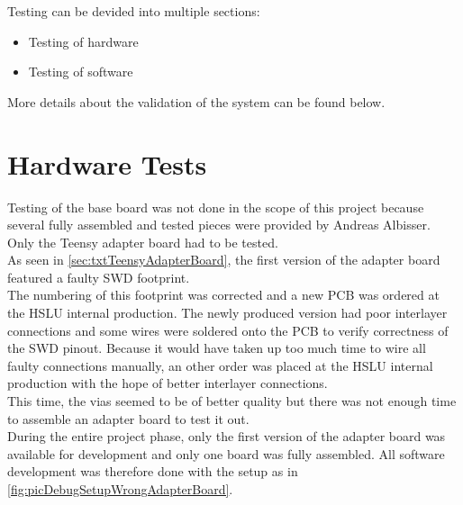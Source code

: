 %
Testing can be devided into multiple sections:
\begin{itemize}
    \item Testing of hardware
    \item Testing of software 
\end{itemize}
More details about the validation of the system can be found below.\\
%
%
%
%
\section{Hardware Tests} \label{sec:txtHardwareTests}
Testing of the base board was not done in the scope of this project because several fully assembled and tested pieces were provided by Andreas Albisser.\\
Only the Teensy adapter board had to be tested. \\
As seen in \autoref{sec:txtTeensyAdapterBoard}, the first version of the adapter board featured a faulty SWD footprint.\\
The numbering of this footprint was corrected and a new PCB was ordered at the HSLU internal production. The newly produced version had poor interlayer connections and some wires were soldered onto the PCB to verify correctness of the SWD pinout. Because it would have taken up too much time to wire all faulty connections manually, an other order was placed at the HSLU internal production with the hope of better interlayer connections.\\
This time, the vias seemed to be of better quality but there was not enough time to assemble an adapter board to test it out.\\
During the entire project phase, only the first version of the adapter board was available for development and only one board was fully assembled. All software development was therefore done with the setup as in \autoref{fig:picDebugSetupWrongAdapterBoard}.
%
%
%
%
%
